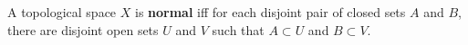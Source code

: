 A topological space $X$ is \textbf{normal} iff for each disjoint pair of closed sets $A$ and $B$, there are disjoint open sets $U$ and $V$ such that $A \subset U$ and $B \subset V$.

